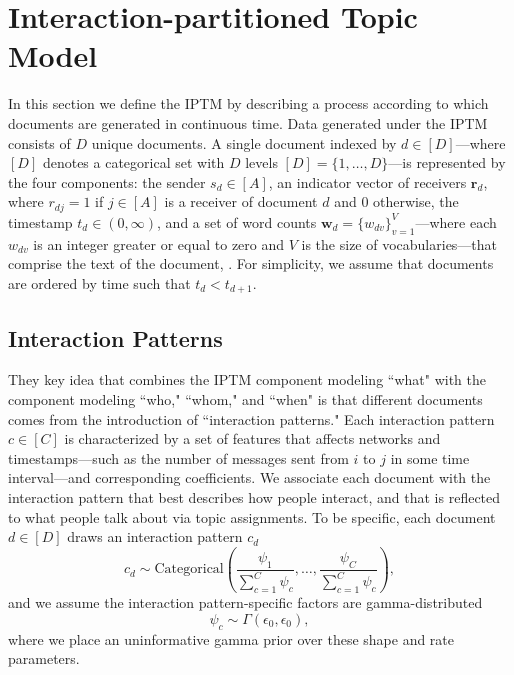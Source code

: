 \documentclass[ba]{imsart}
\numberwithin{equation}{section}
\theoremstyle{plain}
\begin{document}
	\section{Interaction-partitioned Topic Model}\label{sec:generative process}
		In this section we define the IPTM by describing a process according to which documents are generated in continuous time. Data generated under the IPTM consists of $D$ unique documents. A single document indexed by $d \in [D]$---where $[D]$ denotes a categorical set with $D$ levels $[D] = \{1,\ldots,D\}$---is represented by the four components: the sender $s_d \in [A]$, an indicator vector of receivers $\boldsymbol{r}_d$, where $r_{dj}=1$ if $j \in [A]$ is a receiver of document $d$ and 0 otherwise, the timestamp $t_d \in (0, \infty)$, and a set of word counts $\boldsymbol{w}_d= \{w_{dv} \}_{v=1}^{V}$---where each $w_{dv}$ is an integer greater or equal to zero and $V$ is the size of vocabularies---that comprise the text of the document, . For simplicity, we assume that documents are ordered by time such that $t_d < t_{d+1}$.~
		
\subsection{Interaction Patterns}\label{subsec:Interaction patterns}
They key idea that combines the IPTM component modeling ``what" with
the component modeling ``who," ``whom," and ``when" is that different
documents comes from the introduction of ``interaction patterns."  Each interaction pattern $c \in [C]$ is characterized by a set of features that affects networks and timestamps---such as the number of messages sent from $i$ to $j$ in some time interval---and corresponding coefficients. We associate each document with the interaction pattern that best describes how people interact, and that is reflected to what people talk about via topic assignments. To be specific, each document $d \in [D]$ draws an interaction pattern $c_d$
\begin{equation}
c_d\sim \mbox{Categorical}(\frac{\psi_1}{\sum_{c=1}^C \psi_c},\ldots,\frac{\psi_C}{\sum_{c=1}^C \psi_c}),
\end{equation}
and we assume the interaction pattern-specific factors are gamma-distributed
\begin{equation}
\psi_c\sim \Gamma(\epsilon_0,\epsilon_0),
\end{equation}
where we place an uninformative gamma prior over these shape and rate parameters.~
\end{document}
